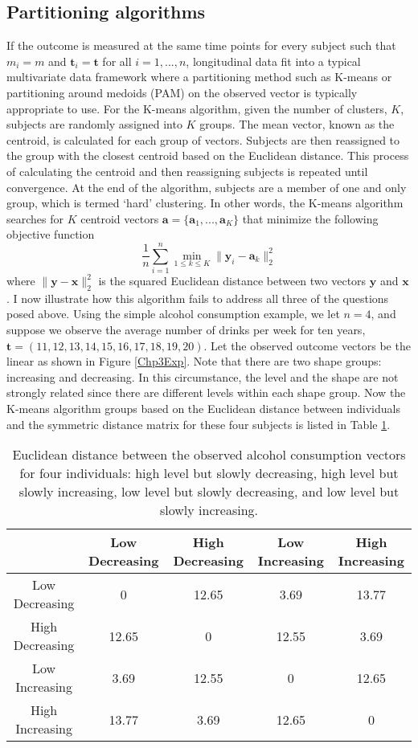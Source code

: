 \documentclass[12pt]{article}
\newcommand{\B}[0]{\mathbf}
\begin{document}
\subsection{Partitioning algorithms}
If the outcome is measured at the same time points for every subject such that $m_{i}=m$ and $\B t_{i}=\B t$ for all $i=1,...,n$, longitudinal data fit into a typical multivariate data framework where a partitioning method such as K-means \cite{macqueen1967, hartigan1979} or partitioning around medoids (PAM) \cite{kaufman1990} on the observed vector is typically appropriate to use. For the K-means algorithm, given the number of clusters, $K$, subjects are randomly assigned into $K$ groups. The mean vector, known as the centroid, is calculated for each group of vectors. Subjects are then reassigned to the group with the closest centroid based on the Euclidean distance. This process of calculating the centroid and then reassigning subjects is repeated until convergence. At the end of the algorithm, subjects are a member of one and only group, which is termed `hard' clustering. In other words, the K-means algorithm searches for $K$ centroid vectors $\B a=\{\B a_{1}, ...,\B a_{K}\}$ that minimize the following objective function
$$\frac{1}{n} \sum^{n}_{i=1}\min_{1\leq k\leq K}\|\B  y_{i}-\B a_{k}\|_{2}^{2}$$
where $\|\B y - \B x\|^{2}_{2}$ is the squared Euclidean distance between two vectors $\B y$ and $\B x$. I now illustrate how this algorithm fails to address all three of the questions posed above. Using the simple alcohol consumption example, we let $n=4$, and suppose we observe the average number of drinks per week for ten years, $\B t=(11,12,13,14,15,16,17,18,19,20)$. Let the observed outcome vectors be the linear as shown in Figure \ref{Chp3Exp}.
Note that there are two shape groups: increasing and decreasing. In this circumstance, the level and the shape are not strongly related since there are different levels within each shape group. Now the K-means algorithm groups based on the Euclidean distance between individuals and the symmetric distance matrix for these four subjects is listed in Table \ref{tab:dist}. 
\begin{table}[h]
\begin{center}
\begin{tabular}{c|cccc}
&Low Decreasing& High Decreasing&Low Increasing&High Increasing\\
\hline
Low Decreasing&0&12.65&3.69&13.77\\
High Decreasing&12.65  &0 &  12.55 &3.69 \\                     
Low Increasing& 3.69 &12.55  &0   &12.65   \\          
High Increasing& 13.77 &3.69 &12.65   &0 
\end{tabular}
\end{center}
\caption{Euclidean distance between the observed alcohol consumption vectors for four individuals: high level but slowly decreasing, high level but slowly increasing, low level but slowly decreasing, and low level but slowly increasing. }
\label{tab:dist}
\end{table}
\end{document}
